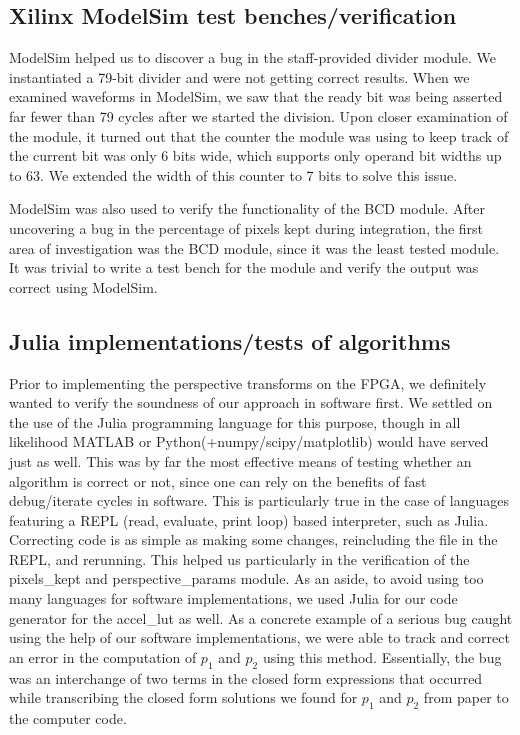 \documentclass{article}
\begin{document}
\subsection{Xilinx ModelSim test benches/verification}
ModelSim helped us to discover a bug in the staff-provided divider module. We instantiated a 79-bit divider and were not getting correct results. When we examined waveforms in ModelSim, we saw that the ready bit was being asserted far fewer than 79 cycles after we started the division. Upon closer examination of the module, it turned out that the counter the module was using to keep track of the current bit was only 6 bits wide, which supports only operand bit widths up to 63. We extended the width of this counter to 7 bits to solve this issue.

ModelSim was also used to verify the functionality of the BCD module. After uncovering a bug in the percentage of pixels kept during integration, the first area of investigation was the BCD module, since it was the least tested module. It was trivial to write a test bench for the module and verify the output was correct using ModelSim. 

\subsection{Julia implementations/tests of algorithms}
Prior to implementing the perspective transforms on the FPGA,
we definitely wanted to verify the soundness of our approach in software first.
We settled on the use of the Julia programming language for this purpose,
though in all likelihood MATLAB or Python(+numpy/scipy/matplotlib) would have served just as well.
This was by far the most effective means of testing whether an algorithm is correct or not,
since one can rely on the benefits of fast debug/iterate cycles in software.
This is particularly true in the case of languages featuring a REPL (read, evaluate, print loop) based interpreter, such as Julia.
Correcting code is as simple as making some changes, reincluding the file in the REPL, and rerunning.
This helped us particularly in the verification of the pixels\_kept and perspective\_params module.
As an aside, to avoid using too many languages for software implementations,
we used Julia for our code generator for the accel\_lut as well.
As a concrete example of a serious bug caught using the help of our software implementations,
we were able to track and correct an error in the computation of $p_1$ and $p_2$ using this method.
Essentially, the bug was an interchange of two terms in the closed form expressions that occurred
while transcribing the closed form solutions we found for $p_1$ and $p_2$ from paper to the computer code.
\end{document}
